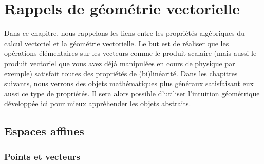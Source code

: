 \chapter{Rappels de géométrie vectorielle}

\sld{\vfill\newpage}%

Dans ce chapitre, nous rappelons les liens entre les propriétés algébriques du calcul vectoriel et la géométrie vectorielle. Le but est de réaliser que les opérations élémentaires sur les vecteurs comme le produit scalaire (mais aussi le produit vectoriel que vous avez déjà manipulées en cours de physique par exemple) satisfait toutes des propriétés de (bi)linéarité. Dans les chapitres suivants, nous verrons des objets mathématiques plus généraux satisfaisant eux aussi ce type de propriétés. Il sera alors possible d'utiliser l'intuition géométrique développée ici pour mieux appréhender les objets abstraits. 

\sld{\vfill\pagebreak[5]}%

\section{Espaces affines}

\subsection{Points et vecteurs}

